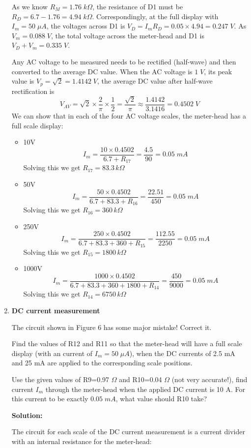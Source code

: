 \begin{enumerate}
  As we know $R_M=1.76\;k\Omega$, the resistance of D1 must be 
  $R_D=6.7-1.76=4.94\;k\Omega$. Correspondingly, at the full display with
  $I_m=50\;\mu A$, the voltages across D1 is
  $V_D=I_m R_D=0.05\times 4.94=0.247\;V$. As $V_m=0.088\;V$, the total
  voltage across the meter-head and D1 is $V_D+V_m=0.335\;V$.

  Any AC voltage to be measured needs to be rectified (half-wave) and then
  converted to the average DC value. When the AC voltage is $1\;V$, its
  peak value is $V_p=\sqrt{2}=1.4142\;V$, the average DC value after
  half-wave rectification is 
  \[
  V_{AV}=\sqrt{2}\times \frac{2}{\pi}\times\frac{1}{2}
  =\frac{\sqrt{2}}{\pi}\approx\frac{1.4142}{3.1416}=0.4502\;V
  \]
  We can show that in each of the four AC voltage scales, the meter-head
  has a full scale display:
  \begin{itemize}
  \item 10V
    \[
    I_m=\frac{10\times 0.4502}{6.7+R_{17}}=\frac{4.5}{90}=0.05\;mA
    \]
    Solving this we get $R_{17}=83.3\,k\Omega$
  \item 50V
    \[
    I_m=\frac{50\times 0.4502}{6.7+83.3+R_{16}}=\frac{22.51}{450}=0.05\;mA
    \]
    Solving this we get $R_{16}=360\,k\Omega$
  \item 250V
    \[
    I_m=\frac{250\times 0.4502}{6.7+83.3+360+R_{15}}=\frac{112.55}{2250}=0.05\;mA
    \]
    Solving this we get $R_{15}=1800\,k\Omega$
  \item 1000V
    \[
    I_m=\frac{1000\times 0.4502}{6.7+83.3+360+1800+R_{14}}=\frac{450}{9000}=0.05\;mA
    \]
    Solving this we get $R_{14}=6750\,k\Omega$
  \end{itemize}


\item {\bf DC current measurement}

  The circuit shown in Figure 6 has some major mistake! Correct it.

  Find the values of R12 and R11 so that the meter-head will have a full
  scale display (with an current of $I_m=50\;\mu A$), when the DC currents 
  of 2.5 mA and 25 mA are applied to the corresponding scale positions.  

  Use the given values of R9=0.97 $\Omega$ and R10=0.04 $\Omega$ (not very 
  accurate!), find current $I_m$ through the meter-head when the applied DC 
  current is 10 A. For this current to be exactly $0.05\;mA$, what value 
  should R10 take?
  

  {\bf Solution:}

  The circuit for each scale of the DC current measurement is a current divider
  with an internal resistance for the meter-head:


\end{enumerate}
